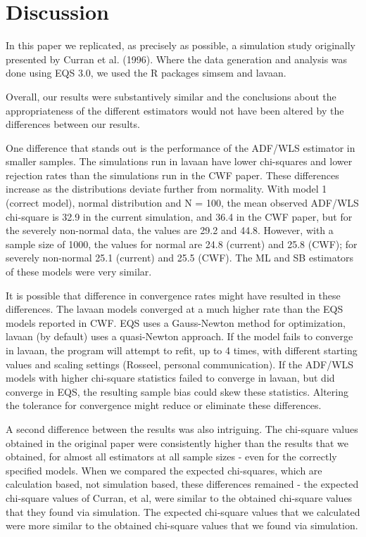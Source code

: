 \documentclass[
  letterpaper,
  DIV=11,
  numbers=noendperiod]{scrartcl}
\begin{document}
\section{Discussion}\label{discussion}

In this paper we replicated, as precisely as possible, a simulation
study originally presented by Curran et al. (1996). Where the data
generation and analysis was done using EQS 3.0, we used the R packages
simsem and lavaan.

Overall, our results were substantively similar and the conclusions
about the appropriateness of the different estimators would not have
been altered by the differences between our results.

One difference that stands out is the performance of the ADF/WLS
estimator in smaller samples. The simulations run in lavaan have lower
chi-squares and lower rejection rates than the simulations run in the
CWF paper. These differences increase as the distributions deviate
further from normality. With model 1 (correct model), normal
distribution and N = 100, the mean observed ADF/WLS chi-square is 32.9
in the current simulation, and 36.4 in the CWF paper, but for the
severely non-normal data, the values are 29.2 and 44.8. However, with a
sample size of 1000, the values for normal are 24.8 (current) and 25.8
(CWF); for severely non-normal 25.1 (current) and 25.5 (CWF). The ML and
SB estimators of these models were very similar.

It is possible that difference in convergence rates might have resulted
in these differences. The lavaan models converged at a much higher rate
than the EQS models reported in CWF. EQS uses a Gauss-Newton method for
optimization, lavaan (by default) uses a quasi-Newton approach. If the
model fails to converge in lavaan, the program will attempt to refit, up
to 4 times, with different starting values and scaling settings
(Rosseel, personal communication). If the ADF/WLS models with higher
chi-square statistics failed to converge in lavaan, but did converge in
EQS, the resulting sample bias could skew these statistics. Altering the
tolerance for convergence might reduce or eliminate these differences.

A second difference between the results was also intriguing. The
chi-square values obtained in the original paper were consistently
higher than the results that we obtained, for almost all estimators at
all sample sizes - even for the correctly specified models. When we
compared the expected chi-squares, which are calculation based, not
simulation based, these differences remained - the expected chi-square
values of Curran, et al, were similar to the obtained chi-square values
that they found via simulation. The expected chi-square values that we
calculated were more similar to the obtained chi-square values that we
found via simulation.
\end{document}
